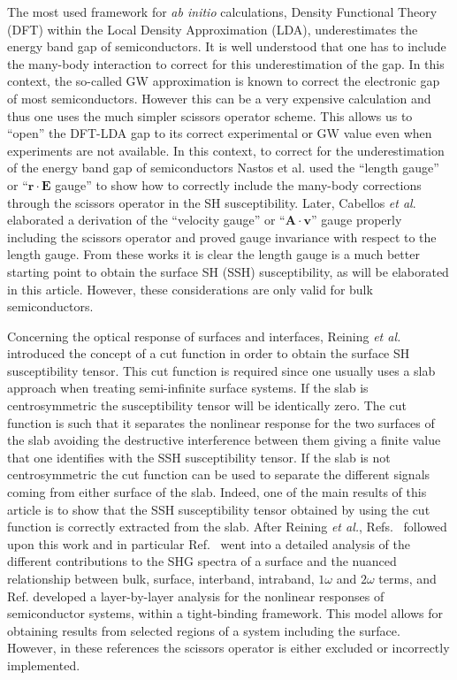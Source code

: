 \documentclass[floatfix,prb,aps,superscriptaddress,showpacs,11pt,preprint,letterpaper]{revtex4}
\begin{document}
The most used framework for \textit{ab initio} calculations, Density 
Functional Theory (DFT) within the Local Density Approximation (LDA),
\cite{kohnPR65} underestimates the energy band gap of semiconductors. It is 
well understood that one has to include the many-body interaction to correct 
for this underestimation of the gap. In this context, the so-called GW 
approximation\cite{onidaRMP02} is known to correct the electronic gap of most 
semiconductors\cite{luceroJPCM12}. However this can be a very expensive
calculation and thus one uses the much simpler scissors operator scheme.
\cite{levinePRL89,levinePRL91,delsolePRB93}  
This allows us to ``open'' the DFT-LDA gap to 
its correct experimental or GW value even when experiments are not available. 
In this context, to correct for the underestimation of the energy band gap of 
semiconductors Nastos et al.\cite{nastosPRB05} used the ``length gauge'' or 
``$\mathbf{r}\cdot\mathbf{E}$ gauge'' to show how to correctly include the 
many-body corrections through the scissors operator in the SH susceptibility.
Later, Cabellos \textit{et al}.\cite{cabellosPRB09} elaborated a derivation 
of the ``velocity gauge'' or ``$\mathbf{A}\cdot\mathbf{v}$'' gauge properly including the 
scissors operator and proved gauge invariance with respect to the length 
gauge. From these works it is clear the length gauge is a much better starting
point to obtain the surface SH (SSH) susceptibility, as will be elaborated 
in this article. However, these considerations are only valid for bulk 
semiconductors.

Concerning the optical response of surfaces and interfaces, Reining 
\textit{et al.}\cite{reiningPRB94} introduced the concept of a cut function 
in order to obtain the surface SH susceptibility tensor. This cut function 
is required since one usually uses a slab approach when treating semi-infinite 
surface systems.\cite{reiningPRB94} If the slab is centrosymmetric the susceptibility tensor will 
be identically zero. The cut function is such that it separates the nonlinear 
response for the two surfaces of the slab avoiding the destructive 
interference between them giving a finite value that one identifies with the 
SSH susceptibility tensor. If the slab is not centrosymmetric the cut function 
can be used to separate the different signals coming from either surface of 
the slab. Indeed, one of the main results of this article is to show that the 
SSH  susceptibility tensor obtained by using the cut function is correctly 
extracted from the slab. After Reining \textit{et al.},\cite{reiningPRB94}
Refs.~
followed 
upon this work and in particular Ref.~ went into a 
detailed analysis of the different contributions to the SHG spectra of a 
surface and the nuanced relationship between bulk, surface, interband, 
intraband, $1\omega$ and $2\omega$ terms, and
Ref.  developed a layer-by-layer 
analysis for the nonlinear responses of semiconductor systems, within a 
tight-binding framework. This model allows for obtaining results from 
selected regions of a system including the surface. However, in these 
references the scissors operator is either excluded or incorrectly 
implemented.
\end{document}
